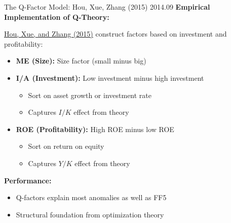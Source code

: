 \documentclass{beamer}
\begin{document}
\begin{frame}{The Q-Factor Model: Hou, Xue, Zhang (2015) 2014.09}
    \textbf{Empirical Implementation of Q-Theory:}
    
    \textcolor{blue}{\href{https://academic.oup.com/rfs/article/28/3/650/1574802}{Hou, Xue, and Zhang (2015)}} construct factors based on investment and profitability:
    
    \vspace{0.2cm}
    \begin{itemize}
        \item \textbf{ME (Size):} Size factor (small minus big)
        
        \item \textbf{I/A (Investment):} Low investment minus high investment
        \begin{itemize}
            \item Sort on asset growth or investment rate
            \item Captures $I/K$ effect from theory
        \end{itemize}
        
        \item \textbf{ROE (Profitability):} High ROE minus low ROE
        \begin{itemize}
            \item Sort on return on equity
            \item Captures $Y/K$ effect from theory
        \end{itemize}
    \end{itemize}
    
    \textbf{Performance:}
    \begin{itemize}
        \item Q-factors explain most anomalies as well as FF5
        \item Structural foundation from optimization theory
    \end{itemize}
\end{frame}
\end{document}
